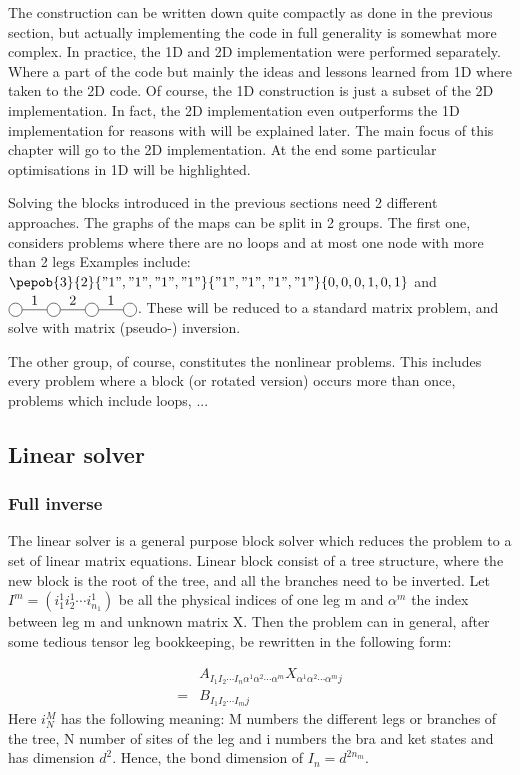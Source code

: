 The construction can be written down quite compactly as done in the previous section, but actually implementing the code in full generality is somewhat more complex. In practice, the 1D and 2D implementation were performed separately. Where a part of the code but mainly the ideas and lessons learned from 1D where taken to the 2D code. Of course, the 1D construction is just a subset of the 2D implementation. In fact, the 2D implementation even outperforms the 1D implementation for reasons with will be explained later. The main focus of this chapter will go to the 2D implementation. At the end some particular optimisations in 1D will be highlighted.

Solving the blocks introduced in the previous sections need 2 different approaches. The graphs of the maps can be split in 2 groups. The first one, considers problems where there are no loops and at most one node with more than 2 legs Examples include:
$\pepob{3}{2}{{"1","1","1","1"}}{{"1","1","1","1"}}{{0,0,0,1,0,1}}$ and $\mpob{4}{ {,"1","2","1",}  }{}{}{}{{,,,,,}}$.
These will be reduced to a standard matrix problem, and solve with matrix (pseudo-) inversion.

The other group, of course, constitutes the nonlinear problems. This includes every problem where a block (or rotated version) occurs more than once, problems which include loops, ...

\subsection{Linear solver} \label{subsec:linear_solver}


\subsubsection{Full inverse}

The linear solver is a general purpose block solver which reduces the problem to a set of linear matrix equations. Linear block consist of a tree structure, where the new block is the root of the tree, and all the branches need to be inverted.  Let $ I^m = (i^1_1 i^1_2 \cdots i^1_{n_1})$ be all the physical indices of one leg m and $\alpha^m$ the index between leg m and unknown matrix X. Then the problem can in general, after some tedious tensor leg bookkeeping, be rewritten in the following form:

\begin{equation}
    \begin{split}
        &A_{ I_1  I_2 \cdots I_n \alpha^1 \alpha^2 \cdots \alpha^m   } X_{ \alpha^1 \alpha^2 \cdots \alpha^m j  } \\
        = &B_{  I_1  I_2 \cdots I_m   j }
    \end{split}
\end{equation}
Here $i^M_N$ has the following meaning: M numbers the different legs or branches of the tree, N number of sites of the leg and i numbers the bra and ket states and has dimension $d^2$. Hence, the bond dimension of $I_n= d^{2 n_m }$.

